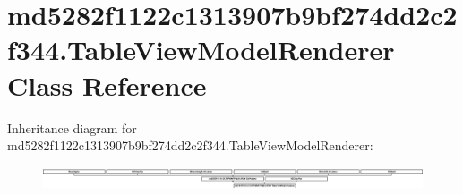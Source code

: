 \hypertarget{classmd5282f1122c1313907b9bf274dd2c2f344_1_1TableViewModelRenderer}{}\section{md5282f1122c1313907b9bf274dd2c2f344.\+Table\+View\+Model\+Renderer Class Reference}
\label{classmd5282f1122c1313907b9bf274dd2c2f344_1_1TableViewModelRenderer}
Inheritance diagram for md5282f1122c1313907b9bf274dd2c2f344.\+Table\+View\+Model\+Renderer\+:\begin{figure}[H]
\begin{center}
\leavevmode
\includegraphics[height=0.684597cm]{classmd5282f1122c1313907b9bf274dd2c2f344_1_1TableViewModelRenderer}
\end{center}
\end{figure}
